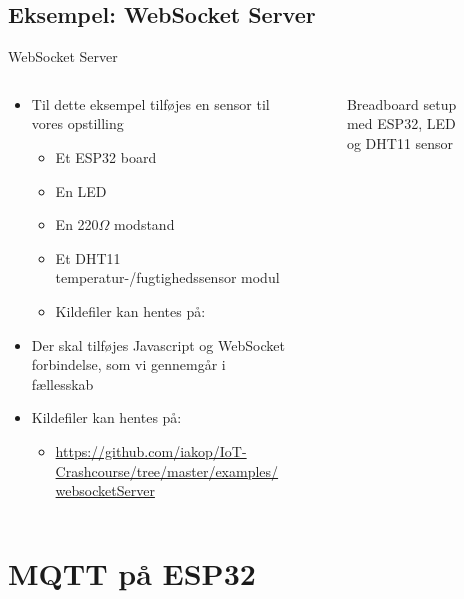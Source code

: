 \documentclass[aspectratio=169]{beamer}
\begin{document}
\subsection{Eksempel: WebSocket Server}
\begin{frame}{WebSocket Server}
\begin{columns}
	\begin{column}{0.6\textwidth}
		\begin{textBox}
		\begin{itemize}
			\item Til dette eksempel tilføjes en sensor til vores opstilling
			\begin{itemize}
				\item Et ESP32 board
				\item En LED
				\item En 220{\textsf{$\Omega$}} modstand
				\item Et DHT11 temperatur-/fugtighedssensor modul
				\item Kildefiler kan hentes på:
			\end{itemize}
			\item Der skal tilføjes Javascript og WebSocket forbindelse, som vi gennemgår i fællesskab
			\item Kildefiler kan hentes på:
			\begin{itemize}
				\item \tiny\url{https://github.com/iakop/IoT-Crashcourse/tree/master/examples/websocketServer}
			\end{itemize}
		\end{itemize}
		\end{textBox}
	\end{column}
	\begin{column}{0.4\textwidth}
		\centering
		\begin{figure}
  			
  			\caption{Breadboard setup med ESP32, LED og DHT11 sensor}
  			\label{fig:esp32-led-dht11}
		\end{figure}
	\end{column}
\end{columns}
\end{frame}

\section{MQTT på ESP32}
\begin{frame}
\end{frame}
\end{document}
